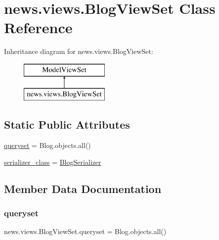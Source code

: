 \hypertarget{classnews_1_1views_1_1_blog_view_set}{}\section{news.\+views.\+Blog\+View\+Set Class Reference}
\label{classnews_1_1views_1_1_blog_view_set}
Inheritance diagram for news.\+views.\+Blog\+View\+Set\+:\begin{figure}[H]
\begin{center}
\leavevmode
\includegraphics[height=2.000000cm]{classnews_1_1views_1_1_blog_view_set}
\end{center}
\end{figure}
\subsection*{Static Public Attributes}
\begin{DoxyCompactItemize}
\item 
\mbox{\hyperlink{classnews_1_1views_1_1_blog_view_set_a1ebd2b9347e2c0bc632416288d723219}{queryset}} = Blog.\+objects.\+all()
\item 
\mbox{\hyperlink{classnews_1_1views_1_1_blog_view_set_aa2cb1ca862d1df2069cea4bb061cf1ba}{serializer\+\_\+class}} = \mbox{\hyperlink{classnews_1_1serializers_1_1_blog_serializer}{Blog\+Serializer}}
\end{DoxyCompactItemize}


\subsection{Member Data Documentation}
\mbox{\label{classnews_1_1views_1_1_blog_view_set_a1ebd2b9347e2c0bc632416288d723219}} 
\subsubsection{\texorpdfstring{queryset}{queryset}}
{\footnotesize\ttfamily news.\+views.\+Blog\+View\+Set.\+queryset = Blog.\+objects.\+all()\hspace{0.3cm}{\ttfamily [static]}}


